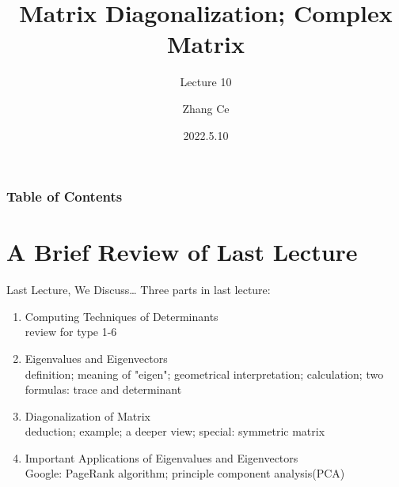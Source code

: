 \documentclass{beamer}
\title[Linear Algebra] %
{Matrix Diagonalization; Complex Matrix}
\subtitle{Lecture 10}
\author[11910803@mail.sustech.edu.cn] %
{
    Zhang Ce
}
\institute[] %
{
    Department of Electrical and Electronic Engineering\\
    Southern University of Science and Technology
}
\date[2022.5.10] %
{2022.5.10}
\begin{document}
\frame{\titlepage}


\begin{frame}
\frametitle{Table of Contents}
\tableofcontents
\end{frame}
\section{A Brief Review of Last Lecture}
\begin{frame}{Last Lecture, We Discuss\dots}
Three parts in last lecture:
    \begin{enumerate}
        \item Computing Techniques of Determinants\\
        review for type 1-6
        \item Eigenvalues and Eigenvectors\\
        definition; meaning of "eigen"; geometrical interpretation; calculation; two formulas: trace and determinant
        \item Diagonalization of Matrix\\
        deduction; example; a deeper view; special: symmetric matrix
        \item Important Applications of Eigenvalues and Eigenvectors\\
        Google: PageRank algorithm; principle component analysis(PCA)
    \end{enumerate}

\end{frame}
\end{document}

